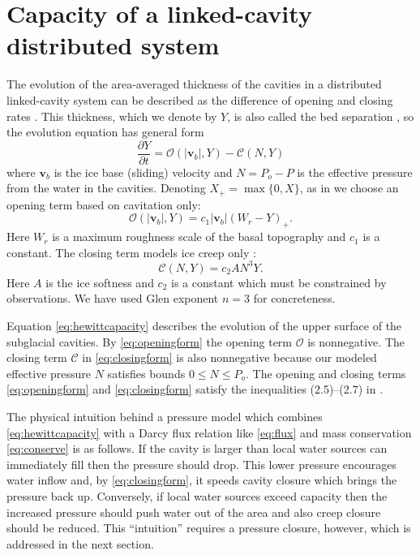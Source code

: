 \documentclass[gmd]{copernicus}   %
\newcommand\bv{\mathbf{v}}
\begin{document}
\section{Capacity of a linked-cavity distributed system} \label{sec:capacity}

The evolution of the area-averaged thickness of the cavities in a distributed linked-cavity system can be described as the difference of opening and closing rates \citep{Hewitt2011}.  This thickness, which we denote by $Y$, is also called the bed separation \citep{Bartholomausetal2011}, so the evolution equation has general form
\begin{equation}
\frac{\partial Y}{\partial t} = \mathcal{O}(|\bv_b|,Y) - \mathcal{C}(N,Y) \label{eq:hewittcapacity}
\end{equation}
where $\bv_b$ is the ice base (sliding) velocity and $N=P_o-P$ is the effective pressure from the water in the cavities.  Denoting $X_+= \max\{0,X\}$, as in \cite{Schoofetal2012} we choose an opening term based on cavitation only:
\begin{equation}
\mathcal{O}(|\bv_b|,Y) = c_1 |\bv_b| (W_r - Y)_+. \label{eq:openingform}
\end{equation}
Here $W_r$ is a maximum roughness scale of the basal topography and $c_1$ is a constant.  The closing term models ice creep only \citep{Hewitt2011,Schoofetal2012}:
\begin{equation}
\mathcal{C}(N,Y) = c_2 A N^3 Y. \label{eq:closingform}
\end{equation}
Here $A$ is the ice softness and $c_2$ is a constant which must be constrained by observations.  We have used Glen exponent $n=3$ for concreteness.

Equation \eqref{eq:hewittcapacity} describes the evolution of the upper surface of the subglacial cavities.  By \eqref{eq:openingform} the opening term $\mathcal{O}$ is nonnegative.  The closing term $\mathcal{C}$ in \eqref{eq:closingform} is also nonnegative because our modeled effective pressure $N$ satisfies bounds $0\le N \le P_o$.  The opening and closing terms \eqref{eq:openingform} and \eqref{eq:closingform} satisfy the inequalities (2.5)--(2.7) in \cite{Schoofetal2012}.

The physical intuition behind a pressure model which combines \eqref{eq:hewittcapacity} with a Darcy flux relation like \eqref{eq:flux} and mass conservation \eqref{eq:conserve} is as follows.  If the cavity is larger than local water sources can immediately fill then the pressure should drop.  This lower pressure encourages water inflow and, by \eqref{eq:closingform}, it speeds cavity closure which brings the pressure back up.  Conversely, if local water sources exceed capacity then the increased pressure should push water out of the area and also creep closure should be reduced.  This ``intuition'' requires a pressure closure, however, which is addressed in the next section.
\end{document}
